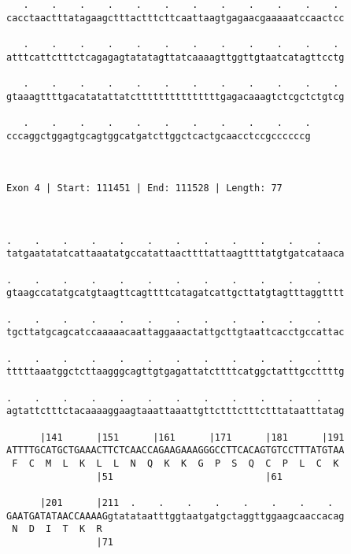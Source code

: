 \documentclass{article}
\begin{document}
\begin{Verbatim}
   .    .    .    .    .    .    .    .    .    .    .    . 
cacctaactttatagaagctttactttcttcaattaagtgagaacgaaaaatccaactcc
                                                            
   .    .    .    .    .    .    .    .    .    .    .    . 
atttcattctttctcagagagtatatagttatcaaaagttggttgtaatcatagttcctg
                                                            
   .    .    .    .    .    .    .    .    .    .    .    . 
gtaaagttttgacatatattatctttttttttttttttgagacaaagtctcgctctgtcg
                                                            
   .    .    .    .    .    .    .    .    .    .    .
cccaggctggagtgcagtggcatgatcttggctcactgcaacctccgccccccg
                                                      
                                                      
 
Exon 4 | Start: 111451 | End: 111528 | Length: 77



.    .    .    .    .    .    .    .    .    .    .    .    
tatgaatatatcattaaatatgccatattaacttttattaagttttatgtgatcataaca
                                                            
.    .    .    .    .    .    .    .    .    .    .    .    
gtaagccatatgcatgtaagttcagttttcatagatcattgcttatgtagtttaggtttt
                                                            
.    .    .    .    .    .    .    .    .    .    .    .    
tgcttatgcagcatccaaaaacaattaggaaactattgcttgtaattcacctgccattac
                                                            
.    .    .    .    .    .    .    .    .    .    .    .    
tttttaaatggctcttaagggcagttgtgagattatcttttcatggctatttgccttttg
                                                            
.    .    .    .    .    .    .    .    .    .    .    .    
agtattctttctacaaaaggaagtaaattaaattgttctttctttctttataatttatag
                                                            
      |141      |151      |161      |171      |181      |191
ATTTTGCATGCTGAAACTTCTCAACCAGAAGAAAGGGCCTTCACAGTGTCCTTTATGTAA
 F  C  M  L  K  L  L  N  Q  K  K  G  P  S  Q  C  P  L  C  K 
                |51                           |61           
  
      |201      |211  .    .    .    .    .    .    .    .  
GAATGATATAACCAAAAGgtatataatttggtaatgatgctaggttggaagcaaccacag
 N  D  I  T  K  R                                           
                |71                                         
  

\end{Verbatim}
\end{document}
